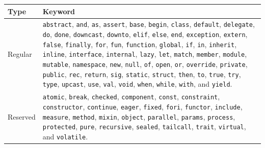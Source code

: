 \documentclass[fsharpNotes.tex]{subfiles}
\begin{document}
\begin{table}
  \centering
  \begin{tabularx}{\textwidth}{|l|>{\raggedright\arraybackslash}X|}
    \hline
    \rowcolor{headerRowColor} Type & Keyword\\
    \hline
  Regular 
  &\mbox{\lstinline{abstract},} \mbox{\lstinline{and},} \mbox{\lstinline{as},} \mbox{\lstinline{assert},} \mbox{\lstinline{base},} \mbox{\lstinline{begin},} \mbox{\lstinline{class},} \mbox{\lstinline{default},} \mbox{\lstinline{delegate},} \mbox{\lstinline{do},} \mbox{\lstinline{done},} \mbox{\lstinline{downcast},} \mbox{\lstinline{downto},} \mbox{\lstinline{elif},} \mbox{\lstinline{else},} \mbox{\lstinline{end},} \mbox{\lstinline{exception},} \mbox{\lstinline{extern},} \mbox{\lstinline{false},} \mbox{\lstinline{finally},} \mbox{\lstinline{for},} \mbox{\lstinline{fun},} \mbox{\lstinline{function},} \mbox{\lstinline{global},} \mbox{\lstinline{if},} \mbox{\lstinline{in},} \mbox{\lstinline{inherit},} \mbox{\lstinline{inline},} \mbox{\lstinline{interface},} \mbox{\lstinline{internal},} \mbox{\lstinline{lazy},} \mbox{\lstinline{let},} \mbox{\lstinline{match},} \mbox{\lstinline{member},} \mbox{\lstinline{module},} \mbox{\lstinline{mutable},} \mbox{\lstinline{namespace},} \mbox{\lstinline{new},} \mbox{\lstinline{null},} \mbox{\lstinline{of},} \mbox{\lstinline{open},} \mbox{\lstinline{or},} \mbox{\lstinline{override},} \mbox{\lstinline{private},} \mbox{\lstinline{public},} \mbox{\lstinline{rec},} \mbox{\lstinline{return},} \mbox{\lstinline{sig},} \mbox{\lstinline{static},} \mbox{\lstinline{struct},} \mbox{\lstinline{then},} \mbox{\lstinline{to},} \mbox{\lstinline{true},} \mbox{\lstinline{try},} \mbox{\lstinline{type},} \mbox{\lstinline{upcast},} \mbox{\lstinline{use},} \mbox{\lstinline{val},} \mbox{\lstinline{void},} \mbox{\lstinline{when},} \mbox{\lstinline{while},} \mbox{\lstinline{with},} and \mbox{\lstinline{yield}.}\\
 Reserved
 & \mbox{\lstinline{atomic},} \mbox{\lstinline{break},} \mbox{\lstinline{checked},} \mbox{\lstinline{component},} \mbox{\lstinline{const},} \mbox{\lstinline{constraint},} \mbox{\lstinline{constructor},} \mbox{\lstinline{continue},} \mbox{\lstinline{eager},} \mbox{\lstinline{fixed},} \mbox{\lstinline{fori},} \mbox{\lstinline{functor},} \mbox{\lstinline{include},} \mbox{\lstinline{measure},} \mbox{\lstinline{method},} \mbox{\lstinline{mixin},} \mbox{\lstinline{object},} \mbox{\lstinline{parallel},} \mbox{\lstinline{params},} \mbox{\lstinline{process},} \mbox{\lstinline{protected},} \mbox{\lstinline{pure},} \mbox{\lstinline{recursive},} \mbox{\lstinline{sealed},} \mbox{\lstinline{tailcall},} \mbox{\lstinline{trait},} \mbox{\lstinline{virtual},} and \mbox{\lstinline{volatile}.}\\

\end{tabularx}
\end{table}
\end{document}
